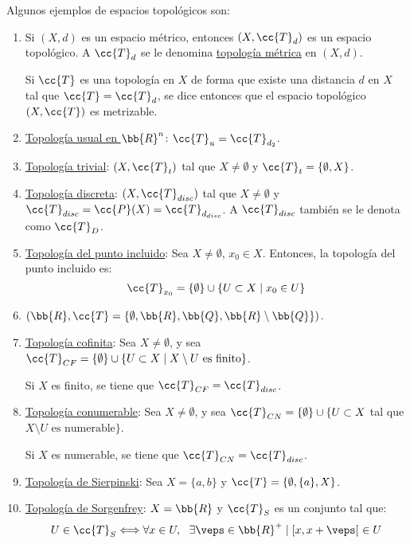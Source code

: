 \begin{ejemplo} Algunos ejemplos de espacios topológicos son:
    \begin{enumerate}
        \item Si $(X,d)$ es un espacio métrico, entonces $(X,\cc{T}_d)$ es un espacio topológico. A $\cc{T}_d$ se le denomina \ul{topología métrica} en $(X,d)$.

        Si $\cc{T}$ es una topología en $X$ de forma que existe una distancia $d$ en $X$ tal que $\cc{T}=\cc{T}_d$, se dice entonces que el espacio topológico $(X,\cc{T})$ es metrizable.

        \item \ul{Topología usual en $\bb{R}^n$}:  $\cc{T}_u=\cc{T}_{d_2}$.

        \item \ul{Topología trivial}: $(X,\cc{T}_t)$ tal que $X\neq \emptyset$ y $\cc{T}_t=\{\emptyset, X\}$.

        \item \ul{Topología discreta}: $(X,\cc{T}_{disc})$ tal que $X\neq \emptyset$ y $\cc{T}_{disc}=\cc{P}(X)=\cc{T}_{d_{disc}}$. A $\cc{T}_{disc}$ también se le denota como $\cc{T}_D$.

        \item \ul{Topología del punto incluido}: Sea $X\neq \emptyset$, $x_0\in X$. Entonces, la topología del punto incluido es:
        \begin{equation*}
            \cc{T}_{x_0}=\{\emptyset\}\cup \{U\subset X\mid x_0\in U\}
        \end{equation*}

        \item $(\bb{R}, \cc{T}=\{\emptyset, \bb{R}, \bb{Q}, \bb{R}\setminus \bb{Q}\})$.

        \item \ul{Topología cofinita}: Sea $X\neq \emptyset$, y sea $\cc{T}_{CF}=\{\emptyset\}\cup \{U\subset X\mid X\setminus U \text{ es finito}\}$.

        Si $X$ es finito, se tiene que $\cc{T}_{CF}=\cc{T}_{disc}$.

        \item \ul{Topología conumerable}: Sea $X\neq \emptyset$, y sea $\cc{T}_{CN}=\{\emptyset\}\cup \{U\subset X$ tal que $X\setminus U \text{ es numerable}\}$.

        Si $X$ es numerable, se tiene que $\cc{T}_{CN}=\cc{T}_{disc}$.

        \item \ul{Topología de Sierpinski}: Sea $X=\{a,b\}$ y $\cc{T}=\{\emptyset, \{a\}, X\}$.

        \item \ul{Topología de Sorgenfrey}: $X=\bb{R}$ y $\cc{T}_S$ es un conjunto tal que:
        \begin{equation*}
            U\in \cc{T}_S \Longleftrightarrow \forall x\in U,~~\exists \veps\in \bb{R}^+ \mid [x,x+\veps[~\in U
        \end{equation*}
    \end{enumerate}
\end{ejemplo}

